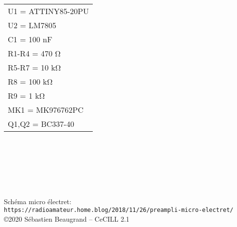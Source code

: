 \documentclass{kicad}
\begin{document}
\begin{center}
~\\
~\\
\\
~\\
~\\
\begin{tabular}{l}
U1 = ATTINY85-20PU\\
U2 = LM7805\\
C1 = 100 \si{\nano\farad}\\
R1-R4 = 470 \si{\ohm}\\
R5-R7 = 10 \si{\kilo\ohm}\\
R8 = 100 \si{\kilo\ohm}\\
R9 = 1 \si{\kilo\ohm}\\
MK1 = MK976762PC\\
Q1,Q2 = BC337-40\\
\end{tabular}
\\
~\\
\\
~\\
~\\
~\\
Schéma micro électret:
\texttt{\small https://radioamateur.home.blog/2018/11/26/preampli-micro-electret/}\\
\vfill
\scriptsize
\copyright 2020 Sébastien Beaugrand -- CeCILL 2.1
\end{center}
\end{document}

